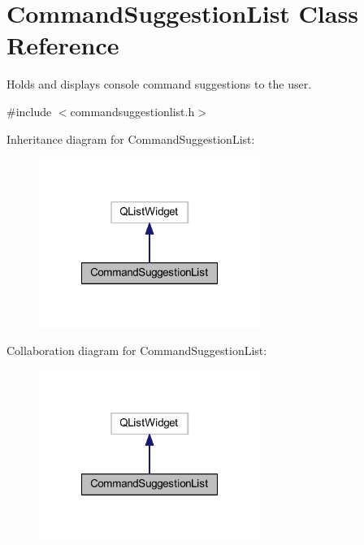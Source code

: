 \hypertarget{class_command_suggestion_list}{\section{Command\-Suggestion\-List Class Reference}
\label{class_command_suggestion_list}
}


Holds and displays console command suggestions to the user.  




{\ttfamily \#include $<$commandsuggestionlist.\-h$>$}



Inheritance diagram for Command\-Suggestion\-List\-:\nopagebreak
\begin{figure}[H]
\begin{center}
\leavevmode
\includegraphics[width=204pt]{class_command_suggestion_list__inherit__graph}
\end{center}
\end{figure}


Collaboration diagram for Command\-Suggestion\-List\-:\nopagebreak
\begin{figure}[H]
\begin{center}
\leavevmode
\includegraphics[width=204pt]{class_command_suggestion_list__coll__graph}
\end{center}
\end{figure}
